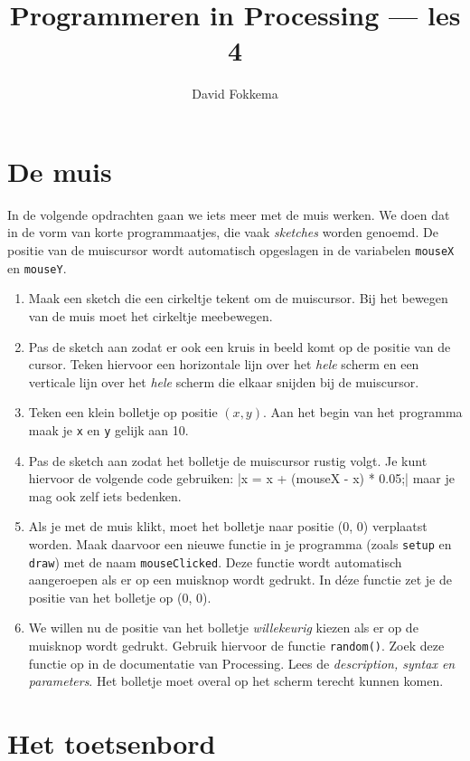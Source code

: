 \documentclass[a4paper,11pt]{article}
\title{Programmeren in Processing --- les 4}
\author{David Fokkema}
\begin{document}
\maketitle

\section{De muis}

In de volgende opdrachten gaan we iets meer met de muis werken.  We doen
dat in de vorm van korte programmaatjes, die vaak \emph{sketches} worden
genoemd.  De positie van de muiscursor wordt automatisch opgeslagen in de
variabelen \verb|mouseX| en \verb|mouseY|.

\begin{enumerate}
\item Maak een sketch die een cirkeltje tekent om de muiscursor.  Bij het
bewegen van de muis moet het cirkeltje meebewegen.
\item Pas de sketch aan zodat er ook een kruis in beeld komt op de positie
van de cursor.  Teken hiervoor een horizontale lijn over het \emph{hele}
scherm en een verticale lijn over het \emph{hele} scherm die elkaar
snijden bij de muiscursor.
\item Teken een klein bolletje op positie $(x, y)$.  Aan het begin van het
programma maak je \verb|x| en \verb|y| gelijk aan 10.
\item Pas de sketch aan zodat het bolletje de muiscursor rustig volgt.  Je
kunt hiervoor de volgende code gebruiken:
|x = x + (mouseX - x) * 0.05;| maar je mag ook zelf iets
bedenken.
\item Als je met de muis klikt, moet het bolletje naar positie (0, 0)
verplaatst worden.  Maak daarvoor een nieuwe functie in je programma
(zoals \verb|setup| en \verb|draw|) met de naam \verb|mouseClicked|.  Deze
functie wordt automatisch aangeroepen als er op een muisknop wordt
gedrukt.  In déze functie zet je de positie van het bolletje op (0, 0).
\item We willen nu de positie van het bolletje \emph{willekeurig} kiezen
als er op de muisknop wordt gedrukt.  Gebruik hiervoor de functie
\verb|random()|.  Zoek deze functie op in de documentatie van Processing.
Lees de \emph{description, syntax en parameters}.  Het bolletje moet
overal op het scherm terecht kunnen komen.
\end{enumerate}


\section{Het toetsenbord}
\end{document}
